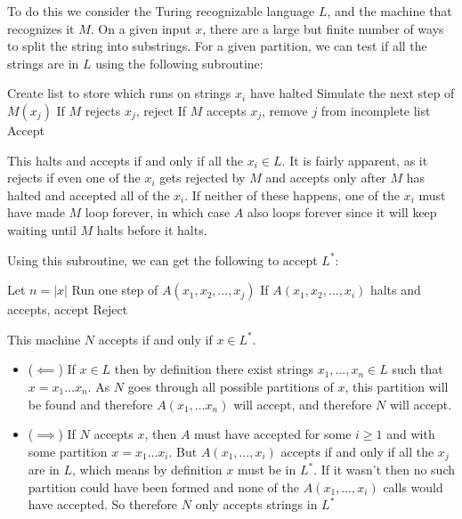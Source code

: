 \documentclass[english]{article}
\begin{document}
To do this we consider the Turing recognizable language $L$, and the machine
that recognizes it $M$.
On a given input $x$, there are a large but finite number of ways to split the
string into substrings. For a given partition, we can test if all the strings
are in $L$ using the following subroutine:
\begin{algorithmic}
\State Create list to store which runs on strings $x_i$ have halted
		\State Simulate the next step of $M(x_j)$
			\State If $M$ rejects $x_j$, reject
			\State If $M$ accepts $x_j$, remove $j$ from incomplete list
		\EndIf
	\EndFor
		\State Accept
	\EndIf
\EndFor
\EndFunction 
\end{algorithmic}

This halts and accepts if and only if all the $x_i \in L$. It is fairly apparent,
as it rejects if even one of the $x_i$ gets rejected by $M$ and accepts only after
$M$ has halted and accepted all of the $x_i$. If neither of these happens,
one of the $x_i$ must have made $M$ loop forever, in which case $A$ also loops
forever since it will keep waiting until $M$ halts before it halts.

Using this subroutine, we can get the following to accept $L^*$:
\begin{algorithmic}
\State Let $n = |x|$
			\State Run one step of $A(x_1,x_2,\ldots,x_j)$
			\State If $A(x_1,x_2,\ldots,x_i)$ halts and accepts, accept
		\EndFor
	\EndFor
\EndFor
\State Reject
\EndFunction 
\end{algorithmic}

This machine $N$ accepts if and only if $x \in L^*$. 
\begin{itemize}
\item ($ \impliedby $) If $x \in L$ then by definition there exist strings
	$x_1, \ldots, x_n \in L$ such that $x = x_1 \ldots x_n$. As $N$
	goes through all possible partitions of $x$, this partition will be
	found and therefore $A(x_1,\ldots x_n)$ will accept, and therefore
	$N$ will accept.
\item ($ \implies $) If $N$ accepts $x$, then $A$ must have accepted
	for some $i \ge 1$ and with some partition $x = x_1 \ldots x_i$.
	But $A(x_1, \ldots, x_i)$ accepts if and only if all the $x_j$ are
	in $L$, which means by definition $x$ must be in $L^*$. If it wasn't
	then no such partition could have been formed and none of the 
	$A(x_1,\ldots,x_i)$ calls would have accepted. So therefore $N$ only
	accepts strings in $L^*$
\end{itemize}
\end{document}
